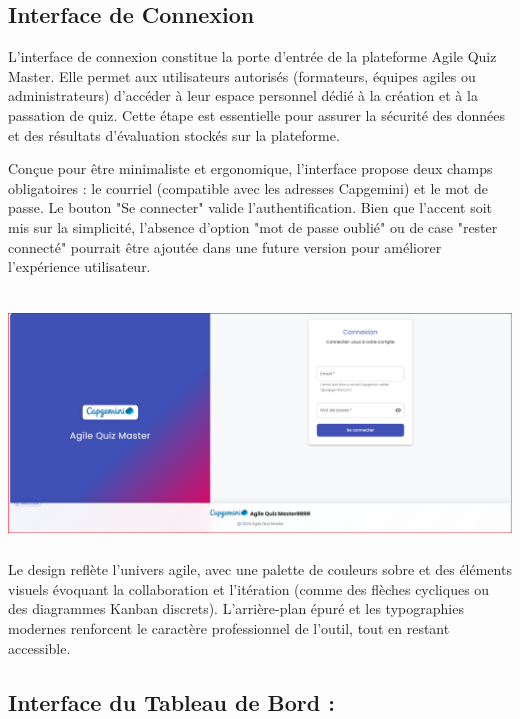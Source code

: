 \documentclass[12pt,a4paper,twoside,openright]{report}
\begin{document}
\hypertarget{interface-de-connexion}{%
\subsection{Interface de Connexion}\label{interface-de-connexion}}

L'interface de connexion constitue la porte d'entrée de la plateforme
Agile Quiz Master. Elle permet aux utilisateurs autorisés (formateurs,
équipes agiles ou administrateurs) d'accéder à leur espace personnel
dédié à la création et à la passation de quiz. Cette étape est
essentielle pour assurer la sécurité des données et des résultats
d'évaluation stockés sur la plateforme.

Conçue pour être minimaliste et ergonomique, l'interface propose deux
champs obligatoires : le courriel (compatible avec les adresses
Capgemini) et le mot de passe. Le bouton "Se connecter" valide
l'authentification. Bien que l'accent soit mis sur la simplicité,
l'absence d'option "mot de passe oublié" ou de case "rester connecté"
pourrait être ajoutée dans une future version pour améliorer
l'expérience utilisateur.

\includegraphics[width=6.3in,height=2.75972in]{latex_media/media/image51.png}Le
design reflète l'univers agile, avec une palette de couleurs sobre et
des éléments visuels évoquant la collaboration et l'itération (comme des
flèches cycliques ou des diagrammes Kanban discrets). L'arrière-plan
épuré et les typographies modernes renforcent le caractère professionnel
de l'outil, tout en restant accessible.

\hypertarget{interface-du-tableau-de-bord}{%
\subsection{Interface du Tableau de Bord
:}\label{interface-du-tableau-de-bord}}
\end{document}

